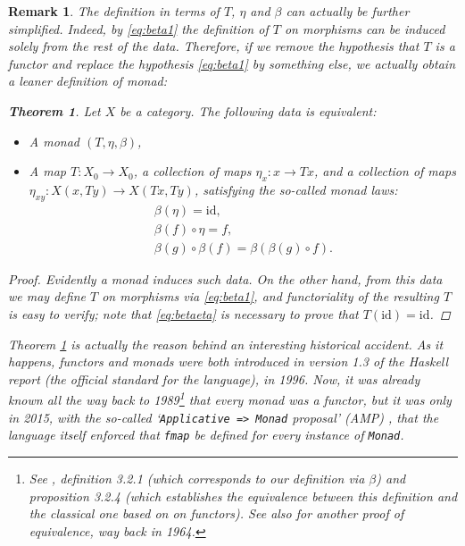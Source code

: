 \documentclass[11pt]{article}
\newtheorem{theorem}{Theorem}
\newtheorem{remark}{Remark}
\theoremstyle{nonumberplain}
\newtheorem{proof}{Proof}
\newcommand{\id}{\mathrm{id}}
\newcommand*\lsin{\lstinline}
\begin{document}
\begin{remark}
The definition in terms of $T$, $\eta$ and $\beta$ can actually be further simplified. Indeed, by \eqref{eq:beta1} the definition of $T$ on morphisms can be induced solely from the rest of the data. Therefore, if we remove the hypothesis that $T$ is a functor and replace the hypothesis \eqref{eq:beta1} by something else, we actually obtain a leaner definition of monad:

\begin{theorem}\label{thm:mon2}
Let $X$ be a category. The following data is equivalent:
\begin{itemize}
\item A monad $(T, \eta, \beta)$,
\item A map $T \colon X_0 \to X_0$, a collection of maps $\eta_x \colon x \to Tx$, and a collection of maps $\eta_{xy} \colon X(x, Ty) \to X(Tx,Ty)$, satisfying the so-called \emph{monad laws}:
\begin{gather}
\beta(\eta) = \id,\label{eq:betaeta}\\
\beta(f) \circ \eta = f,\\
\beta(g) \circ \beta(f) = \beta(\beta(g) \circ f).
\end{gather}
\end{itemize}
\end{theorem}

\begin{proof}
Evidently a monad induces such data. On the other hand, from this data we may define $T$ on morphisms via \eqref{eq:beta1}, and functoriality of the resulting $T$ is easy to verify; note that \eqref{eq:betaeta} is necessary to prove that $T(\id) = \id$.
\end{proof}

Theorem \ref{thm:mon2} is actually the reason behind an interesting historical accident. As it happens, functors and monads were both introduced in version 1.3 of the Haskell report (the official standard for the language), in 1996. Now, it was already known all the way back to 1989\footnote{See \cite{moggi1}, definition 3.2.1 (which corresponds to our definition via $\beta$) and proposition 3.2.4 (which establishes the equivalence between this definition and the classical one based on on functors). See also \cite{kleisli} for another proof of equivalence, way back in 1964.} that every monad was a functor, but it was only in 2015, with the so-called `\lsin|Applicative => Monad| proposal' (AMP) \cite{amp}, that the language itself enforced that \lsin|fmap| be defined for every instance of \lsin|Monad|. 
\end{remark}
\end{document}
